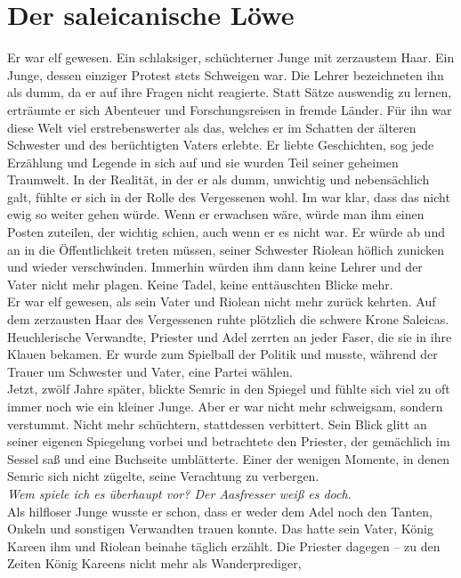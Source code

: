 
\chapter{Der saleicanische Löwe}
Er war elf gewesen. Ein schlaksiger, schüchterner Junge mit zerzaustem Haar. Ein Junge, dessen 
einziger Protest stets Schweigen war. Die Lehrer bezeichneten ihn als dumm, da er auf ihre Fragen 
nicht reagierte. Statt Sätze auswendig zu lernen, erträumte er sich Abenteuer und Forschungsreisen 
in fremde Länder. Für ihn war diese Welt viel erstrebenswerter als das, welches er im Schatten der 
älteren Schwester und des berüchtigten Vaters erlebte. Er liebte Geschichten, sog jede Erzählung und 
Legende in sich auf und sie wurden Teil seiner geheimen Traumwelt. In der Realität, in der er als 
dumm, unwichtig und nebensächlich galt, fühlte er sich in der Rolle des Vergessenen wohl. Im war 
klar, dass das nicht ewig so weiter gehen würde. Wenn er erwachsen wäre, würde man ihm einen Posten 
zuteilen, der wichtig schien, auch wenn er es nicht war. Er würde ab und an in die Öffentlichkeit 
treten müssen, seiner Schwester Riolean höflich zunicken und wieder verschwinden. Immerhin würden 
ihm dann keine Lehrer und der Vater nicht mehr plagen. Keine Tadel, keine enttäuschten Blicke 
mehr.\\
Er war elf gewesen, als sein Vater und Riolean nicht mehr zurück kehrten. Auf dem zerzausten Haar 
des Vergessenen ruhte plötzlich die schwere Krone Saleicas. Heuchlerische Verwandte, Priester und 
Adel zerrten an jeder Faser, die sie in ihre Klauen bekamen. Er wurde zum Spielball der Politik und 
musste, während der Trauer um Schwester und Vater, eine Partei wählen.\\
Jetzt, zwölf Jahre später, blickte Semric in den Spiegel und fühlte sich viel zu oft immer noch wie 
ein kleiner Junge. Aber er war nicht mehr schweigsam, sondern verstummt. Nicht mehr schüchtern, 
stattdessen verbittert. Sein Blick glitt an seiner eigenen Spiegelung vorbei und betrachtete den 
Priester, der gemächlich im Sessel saß und eine Buchseite umblätterte. Einer der wenigen Momente, 
in denen Semric sich nicht zügelte, seine Verachtung zu verbergen.\\
\textit{Wem spiele ich es überhaupt vor? Der Aasfresser weiß es doch.}\\
Als hilfloser Junge wusste er schon, dass er weder dem Adel noch den Tanten, Onkeln und sonstigen 
Verwandten trauen konnte. Das hatte sein Vater, König Kareen ihm und Riolean beinahe täglich 
erzählt. Die Priester dagegen – zu den Zeiten König Kareens nicht mehr als Wanderprediger, 
